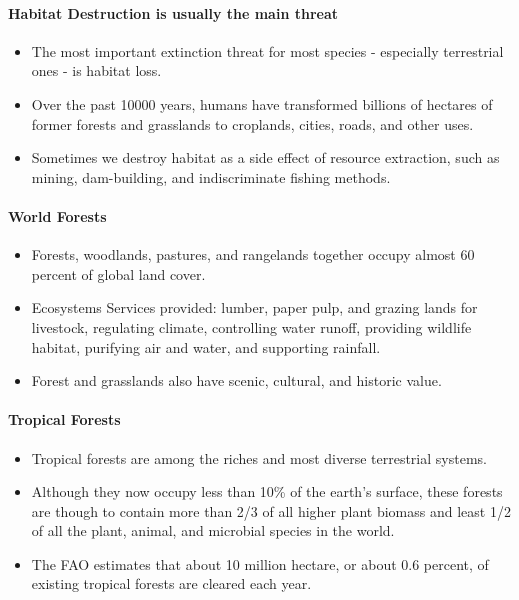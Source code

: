 \documentclass[10pt]{article}
\begin{document}
\paragraph{Habitat Destruction is usually the main threat} 
\begin{itemize}
    \item The most important extinction threat for most species - especially terrestrial ones - is habitat loss. 
    \item Over the past 10000 years, humans have transformed billions of hectares of former forests and grasslands to croplands, cities, roads, and other uses. 
    \item Sometimes we destroy habitat as a side effect of resource extraction, such as mining, dam-building, and indiscriminate fishing methods.  
\end{itemize}

\paragraph{World Forests}
\begin{itemize}
    \item Forests, woodlands, pastures, and rangelands together occupy almost 60 percent of global land cover. 
    \item Ecosystems Services provided: lumber, paper pulp, and grazing lands for livestock, regulating climate, controlling water runoff, providing wildlife habitat, purifying air and water, and supporting rainfall. 
    \item Forest and grasslands also have scenic, cultural, and historic value. 
\end{itemize}

\paragraph{Tropical Forests}
\begin{itemize}
    \item Tropical forests are among the riches and most diverse terrestrial systems. 
    \item Although they now occupy less than 10\% of the earth's surface, these forests are though to contain more than 2/3 of all higher plant biomass and least 1/2 of all the plant, animal, and microbial species in the world.
    \item The FAO estimates that about 10 million hectare, or about 0.6 percent, of existing tropical forests are cleared each year. 
\end{itemize}
\end{document}
